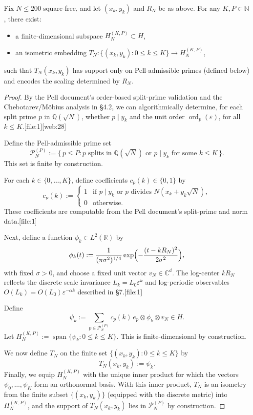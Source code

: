 \documentclass[11pt]{article}
\begin{document}
\begin{lemma}
\label{lem:pell-chart}
Fix \(N\le 200\) square-free, and let \((x_k,y_k)\) and \(R_N\) be as
above. For any \(K,P\in\mathbb{N}\), there exist:
\begin{itemize}
  \item a finite-dimensional subspace \(H_N^{(K,P)} \subset H\),
  \item an isometric embedding \(T_N : \{(x_k,y_k) : 0\le k\le K\}
                               \to H_N^{(K,P)}\),
\end{itemize}
such that \(T_N(x_k,y_k)\) has support only on Pell-admissible primes
(defined below) and encodes the scaling determined by \(R_N\).
\end{lemma}

\begin{proof}
By the Pell document's order-based split-prime validation and the
Chebotarev/M\"obius analysis in §4.2, we can algorithmically determine,
for each split prime \(p\) in \(\mathbb{Q}(\sqrt{N})\), whether
\(p \mid y_k\) and the unit order \(\operatorname{ord}_p(\varepsilon)\),
for all \(k \le K\).[file:1][web:28]

Define the Pell-admissible prime set
\[
\mathcal{P}_N^{(P)} :=
\{\, p \le P : p \text{ splits in }\mathbb{Q}(\sqrt{N}) \text{ or }
                p\mid y_k \text{ for some } k \le K \,\}.
\]
This set is finite by construction.

For each \(k \in \{0,\dots,K\}\), define coefficients
\(c_p(k) \in \{0,1\}\) by
\[
c_p(k) :=
\begin{cases}
1 & \text{if } p\mid y_k \text{ or } p\text{ divides }
                 N(x_k + y_k\sqrt{N}),\\
0 & \text{otherwise}.
\end{cases}
\]
These coefficients are computable from the Pell document's split-prime
and norm data.[file:1]

Next, define a function \(\phi_k \in L^2(\mathbb{R})\) by
\[
\phi_k(t) :=
\frac{1}{(\pi\sigma^2)^{1/4}}
\exp\Bigl(-\frac{(t - k R_N)^2}{2\sigma^2}\Bigr),
\]
with fixed \(\sigma>0\), and choose a fixed unit vector
\(v_N \in \mathbb{C}^d\).
The log-center \(k R_N\) reflects the discrete scale invariance
\(L_k = L_0 \varepsilon^k\) and log-periodic observables
\(O(L_k) = O(L_0)\varepsilon^{-\alpha k}\) described in §7.[file:1]

Define
\[
\psi_k := \sum_{p \in \mathcal{P}_N^{(P)}} c_p(k)\,
          e_p \otimes \phi_k \otimes v_N \in H.
\]
Let \(H_N^{(K,P)} := \operatorname{span}\{\psi_k : 0\le k\le K\}\).
This is finite-dimensional by construction.

We now define \(T_N\) on the finite set
\(\{(x_k,y_k) : 0\le k\le K\}\) by
\[
T_N(x_k,y_k) := \psi_k.
\]
Finally, we equip \(H_N^{(K,P)}\) with the unique inner product for
which the vectors \(\psi_0,\dots,\psi_K\) form an orthonormal basis.
With this inner product, \(T_N\) is an isometry from the finite subset
\(\{(x_k,y_k)\}\) (equipped with the discrete metric) into
\(H_N^{(K,P)}\), and the support of \(T_N(x_k,y_k)\) lies in
\(\mathcal{P}_N^{(P)}\) by construction.
\end{proof}
\end{document}
